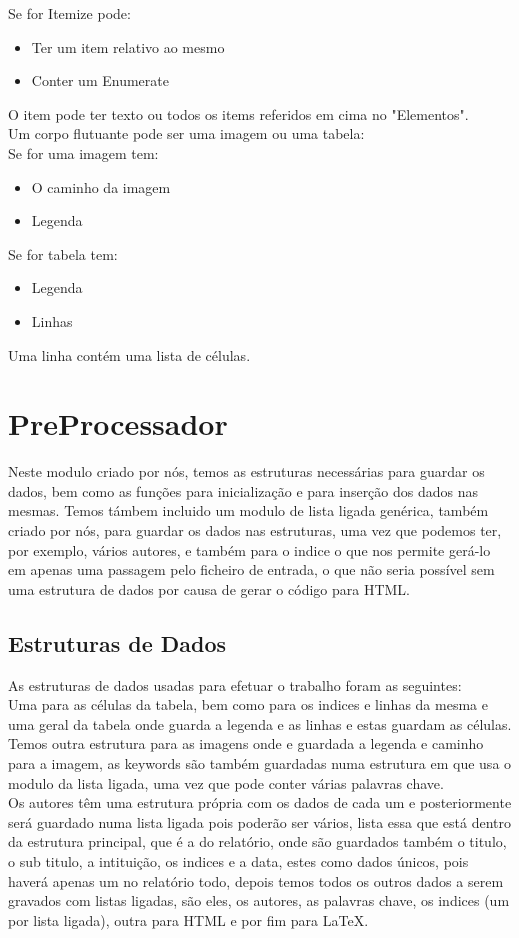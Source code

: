 \documentclass[11pt, a4paper]{report}
\begin{document}
Se for Itemize pode: \\
\begin{itemize}
\item Ter um item relativo ao mesmo
\item Conter um Enumerate
\end{itemize}
O item pode ter texto ou todos os items referidos em cima no "Elementos".\\
Um corpo flutuante pode ser uma imagem ou uma tabela:\\
Se for uma imagem tem:\\
\begin{itemize}
\item O caminho da imagem
\item Legenda
\end{itemize}
Se for tabela tem:\\
\begin{itemize}
\item Legenda
\item Linhas
\end{itemize}
Uma linha contém uma lista de células.\\
\section{PreProcessador}
Neste modulo criado por nós, temos as estruturas necessárias para guardar os dados, bem como as funções para inicialização e para inserção dos dados nas mesmas. Temos támbem incluido um modulo de lista ligada genérica, também criado por nós, para guardar os dados nas estruturas, uma vez que podemos ter, por exemplo, vários autores, e também para o indice o que nos permite gerá-lo em apenas uma passagem pelo ficheiro de entrada, o que não seria possível sem uma estrutura de dados por causa de gerar o código para HTML.\\
\subsection{Estruturas de Dados}
As estruturas de dados usadas para efetuar o trabalho foram as seguintes:\\
Uma para as células da tabela, bem como para os indices e linhas da mesma e uma geral da tabela onde guarda a legenda e as linhas e estas guardam as células.\\
Temos outra estrutura para as imagens onde e guardada a legenda e caminho para a imagem, as keywords são também guardadas numa estrutura em que usa o modulo da lista ligada, uma vez que pode conter várias palavras chave.\\
Os autores têm uma estrutura própria com os dados de cada um e posteriormente será guardado numa lista ligada pois poderão ser vários, lista essa que está dentro da estrutura principal, que é a do relatório, onde são guardados também o titulo, o sub titulo, a intituição, os indices e a data, estes como dados únicos, pois haverá apenas um no relatório todo, depois temos todos os outros dados a serem gravados com listas ligadas, são eles, os autores, as palavras chave, os indices (um por lista ligada), outra para HTML e por fim para LaTeX.\\
\end{document}
